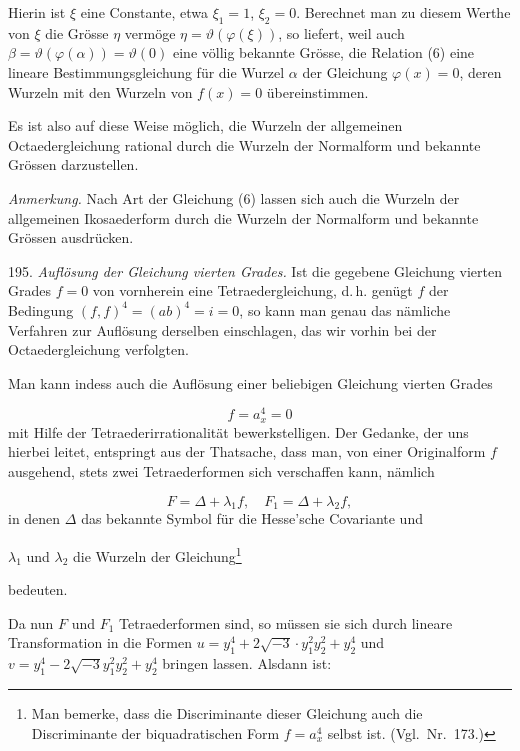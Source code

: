 
Hierin ist $\xi$ eine Constante, etwa $\xi_1=1$, $\xi_2=0$. Berechnet man zu diesem Werthe von $\xi$ die Grösse $\eta$ vermöge $\eta=\vartheta(\varphi(\xi))$, so liefert, weil auch $\beta=\vartheta(\varphi(\alpha))=\vartheta(0)$ eine völlig bekannte Grösse, die Relation (6) eine lineare Bestimmungsgleichung für die Wurzel $\alpha$ der Gleichung $\varphi(x)=0$, deren Wurzeln mit den Wurzeln von $f(x)=0$ übereinstimmen.

Es ist also auf diese Weise möglich, die Wurzeln der allgemeinen Octaedergleichung rational durch die Wurzeln der Normalform und bekannte Grössen darzustellen.

\textit{Anmerkung.} Nach Art der Gleichung (6) lassen sich auch die Wurzeln der allgemeinen Ikosaederform durch die Wurzeln der Normalform und bekannte Grössen ausdrücken.

195. \textit{Auflösung der Gleichung vierten Grades.} Ist die gegebene Gleichung vierten Grades $f=0$ von vornherein eine Tetraedergleichung, d.\,h. genügt $f$ der Bedingung $(f,f)^4=(ab)^4=i=0$, so kann man genau das nämliche Verfahren zur Auflösung derselben einschlagen, das wir vorhin bei der Octaedergleichung verfolgten.

Man kann indess auch die Auflösung einer beliebigen Gleichung vierten Grades

\[
f = a_x^4 = 0
\]
mit Hilfe der Tetraederirrationalität bewerkstelligen. Der Gedanke, der uns hierbei leitet, entspringt aus der Thatsache, dass man, von einer Originalform $f$ ausgehend, stets zwei Tetraederformen sich verschaffen kann, nämlich

\[
F = \Delta+\lambda_1 f,\quad F_1=\Delta+\lambda_2 f,
\]
in denen $\Delta$ das bekannte Symbol für die Hesse'sche Covariante und


$\lambda_1$ und $\lambda_2$ die Wurzeln der Gleichung\footnote{Man bemerke, dass die Discriminante dieser Gleichung auch die Discriminante der biquadratischen Form $f=a_x^4$ selbst ist. (Vgl.\ Nr.\ 173.)}


bedeuten.

Da nun $F$ und $F_1$ Tetraederformen sind, so müssen sie sich durch lineare Transformation in die Formen $u = y_1^4 + 2\sqrt{-3}\cdot y_1^2y_2^2+y_2^4$ und $v=y_1^4-2\sqrt{-3}y_1^2y_2^2+y_2^4$ bringen lassen. Alsdann ist:


